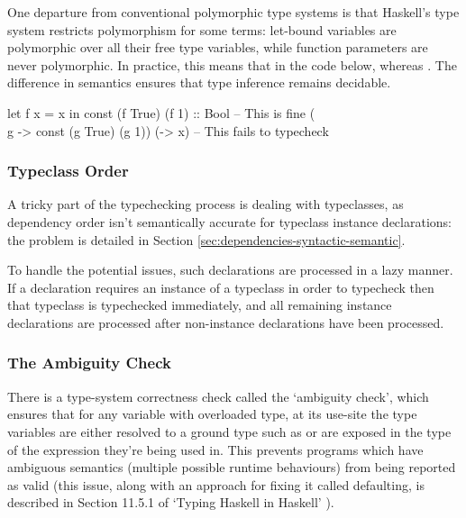 \documentclass[dissertation.tex]{subfiles}
\begin{document}
{{{            One departure from conventional polymorphic type systems is that Haskell's type system restricts
            polymorphism for some terms: let-bound variables are polymorphic over all their free type variables, while
            function parameters are never polymorphic. In practice, this means that in the code below,  whereas . The
            difference in semantics ensures that type inference remains decidable.

            \begin{haskellfigure}
            let f x = x in const (f True) (f 1) :: Bool -- This is fine
            (\\g -> const (g True) (g 1)) (\x -> x)     -- This fails to typecheck
            \end{haskellfigure}
        }
        \subsubsection{Typeclass Order}
        {

            A tricky part of the typechecking process is dealing with typeclasses, as dependency order isn't
            semantically accurate for typeclass instance declarations: the problem is detailed in Section
            \ref{sec:dependencies-syntactic-semantic}.
            
            To handle the potential issues, such declarations are processed in a lazy manner. If a declaration requires
            an instance of a typeclass in order to typecheck then that typeclass is typechecked immediately, and all
            remaining instance declarations are processed after non-instance declarations have been processed.

        }
        \subsubsection{The Ambiguity Check}
        {

            There is a type-system correctness check called the `ambiguity check', which ensures that for any variable
            with overloaded type, at its use-site the type variables are either resolved to a ground type such as
             or are exposed in the type of the expression they're being used in. This prevents programs
            which have ambiguous semantics (multiple possible runtime behaviours) from being reported as valid (this
            issue, along with an approach for fixing it called defaulting, is described in Section 11.5.1 of `Typing
            Haskell in Haskell' \cite{THIH}).
            
}}}
\end{document}
